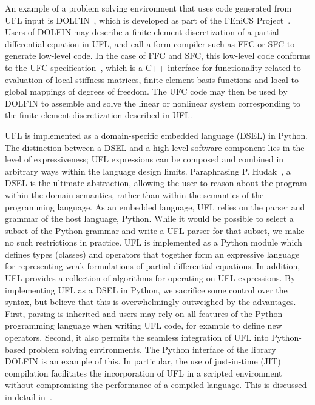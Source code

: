 \documentclass[prodmode,acmtoms]{acmsmall}
\begin{document}
An example of a problem solving environment that uses code generated from
UFL input is DOLFIN~\citep{logg:2010,logg:2012b}, which is developed
as part of the FEniCS Project~\citep{fenics:book}. Users of DOLFIN
may describe a finite element discretization of a partial differential
equation in UFL, and call a form compiler such as FFC or SFC to generate
low-level code. In the case of FFC and SFC, this low-level code conforms
to the UFC specification~\citep{AlnaesLoggEtAl2009a,AlnaesLoggEtAl2012a},
which is a C++ interface for functionality related to evaluation of local
stiffness matrices, finite element basis functions and local-to-global
mappings of degrees of freedom. The UFC code may then be used by DOLFIN
to assemble and solve the linear or nonlinear system corresponding to
the finite element discretization described in UFL.

UFL is implemented as a domain-specific embedded language (DSEL) in
Python. The distinction between a DSEL and a high-level software
component lies in the level of expressiveness; UFL expressions can be
composed and combined in arbitrary ways within the language design
limits.
Paraphrasing P. Hudak~\citep{hudak1996building}, a DSEL is the ultimate
abstraction, allowing the user to reason about the program within the
domain semantics, rather than within the semantics of the
programming language.
As an embedded language, UFL relies on the parser and grammar of the
host language, Python. While it would be possible to select a
subset of the Python grammar and write a UFL parser for that
subset, we make no such restrictions in practice.
UFL is implemented as a Python module which defines
types (classes) and operators that together form an
expressive language for representing weak formulations of partial
differential equations. In addition, UFL provides a collection of
algorithms for operating on UFL expressions. By implementing UFL as a
DSEL in Python, we sacrifice some control over the syntax, but believe
that this is overwhelmingly outweighed by the advantages. First,
parsing is inherited and users may rely on all features of the Python
programming language when writing UFL code, for example to define new
operators. Second, it also permits the seamless integration of UFL
into Python-based problem solving environments. The Python interface
of the library DOLFIN is an example of this. In particular, the use of
just-in-time (JIT) compilation facilitates the incorporation of UFL in
a scripted environment without compromising the performance of a
compiled language. This is discussed in detail in~\citet{logg:2010}.
\end{document}
